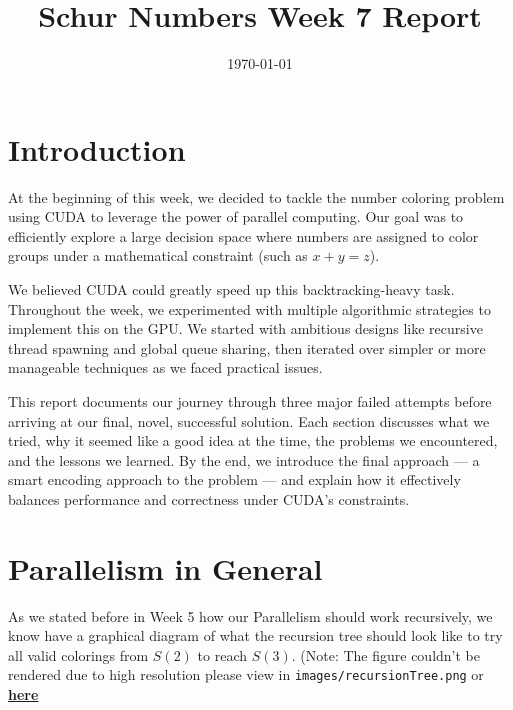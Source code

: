 \documentclass[12pt]{article}
\begin{document}
\title{Schur Numbers Week 7 Report}
\date{\today}

\tableofcontents
\newpage
\maketitle

\section{Introduction}

At the beginning of this week, we decided to tackle the number coloring problem using CUDA to leverage the power of parallel computing. Our goal was to efficiently explore a large decision space where numbers are assigned to color groups under a mathematical constraint (such as \(x + y = z\)).

We believed CUDA could greatly speed up this backtracking-heavy task. Throughout the week, we experimented with multiple algorithmic strategies to implement this on the GPU. We started with ambitious designs like recursive thread spawning and global queue sharing, then iterated over simpler or more manageable techniques as we faced practical issues.

This report documents our journey through three major failed attempts before arriving at our final, novel, successful solution. Each section discusses what we tried, why it seemed like a good idea at the time, the problems we encountered, and the lessons we learned. By the end, we introduce the final approach — a smart encoding approach to the problem — and explain how it effectively balances performance and correctness under CUDA's constraints.


\section{Parallelism in General}

As we stated before in Week 5 how our Parallelism should work recursively, we know have a graphical diagram of what the recursion tree should look like to try all valid colorings from $S(2)$ to reach $S(3)$. (Note: The figure couldn't be rendered due to high resolution please view in \texttt{images/recursionTree.png} or \href{https://github.com/Abdulrhman-shaheen/CSE326-Schur-Numbers-/blob/master/Week8/tex/images/recursionTree.png}{\textbf{\color{blue}\underline{here}}}
\end{document}
